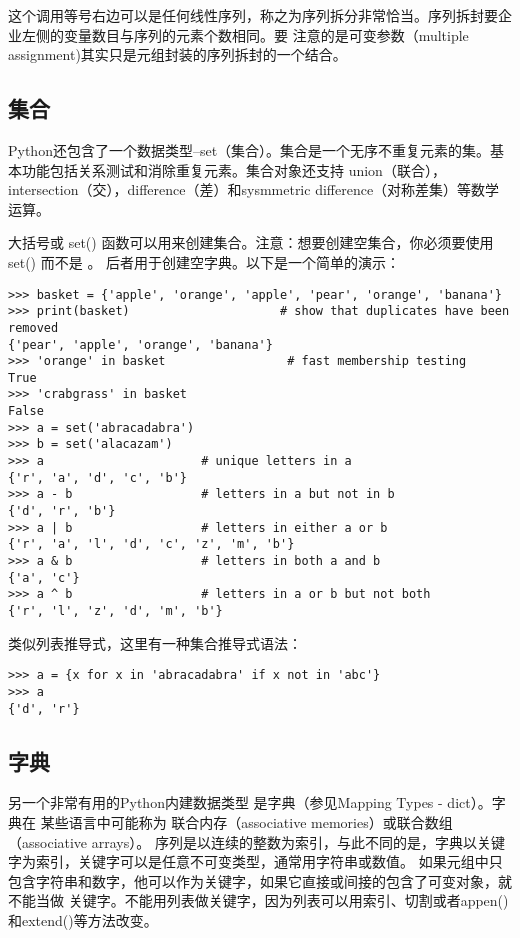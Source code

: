 \documentclass[UTF8]{ctexart}
\begin{document}
这个调用等号右边可以是任何线性序列，称之为序列拆分非常恰当。序列拆封要企业左侧的变量数目与序列的元素个数相同。要
注意的是可变参数（multiple assignment)其实只是元组封装的序列拆封的一个结合。

\subsection{集合}
Python还包含了一个数据类型--set（集合）。集合是一个无序不重复元素的集。基本功能包括关系测试和消除重复元素。集合对象还支持
union（联合），intersection（交），difference（差）和sysmmetric difference（对称差集）等数学运算。

大括号或 set() 函数可以用来创建集合。注意：想要创建空集合，你必须要使用 set() 而不是 {}。
后者用于创建空字典。以下是一个简单的演示：
\begin{verbatim}
>>> basket = {'apple', 'orange', 'apple', 'pear', 'orange', 'banana'}
>>> print(basket)                     # show that duplicates have been removed
{'pear', 'apple', 'orange', 'banana'}
>>> 'orange' in basket                 # fast membership testing
True
>>> 'crabgrass' in basket
False
>>> a = set('abracadabra')
>>> b = set('alacazam')
>>> a                      # unique letters in a
{'r', 'a', 'd', 'c', 'b'}
>>> a - b                  # letters in a but not in b
{'d', 'r', 'b'}
>>> a | b                  # letters in either a or b
{'r', 'a', 'l', 'd', 'c', 'z', 'm', 'b'}
>>> a & b                  # letters in both a and b
{'a', 'c'}
>>> a ^ b                  # letters in a or b but not both
{'r', 'l', 'z', 'd', 'm', 'b'}
\end{verbatim}

类似列表推导式，这里有一种集合推导式语法：
\begin{verbatim}
>>> a = {x for x in 'abracadabra' if x not in 'abc'}
>>> a
{'d', 'r'}
\end{verbatim}

\subsection{字典}
另一个非常有用的Python内建数据类型 是字典（参见Mapping Types - dict）。字典在
某些语言中可能称为 联合内存（associative memories）或联合数组（associative arrays）。
序列是以连续的整数为索引，与此不同的是，字典以关键字为索引，关键字可以是任意不可变类型，通常用字符串或数值。
如果元组中只包含字符串和数字，他可以作为关键字，如果它直接或间接的包含了可变对象，就不能当做
关键字。不能用列表做关键字，因为列表可以用索引、切割或者appen()和extend()等方法改变。
\end{document}
